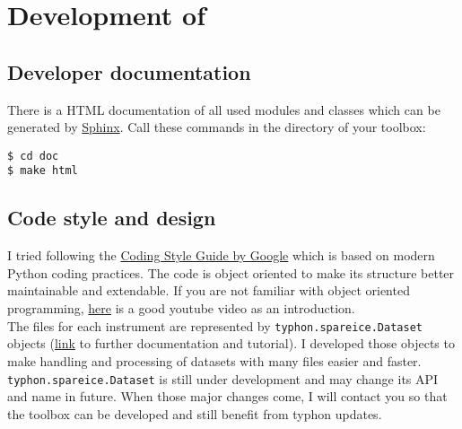 \documentclass[11pt,a4paper]{article}
\begin{document}
\section{Development of \cloud}
\label{sec:development}

\subsection{Developer documentation}
There is a HTML documentation of all used modules and classes which can be generated by \href{http://www.sphinx-doc.org/en/stable/install.html}{Sphinx}. Call these commands in the directory of your \cloud toolbox:

\texttt{\$ cd doc}\\
\texttt{\$ make html}\\

\subsection{Code style and design}
I tried following the \href{https://google.github.io/styleguide/pyguide.html}{Coding Style Guide by Google}  which is based on modern Python coding practices. The code is object oriented to make its structure better maintainable and extendable. If you are not familiar with object oriented programming, \href{https://www.youtube.com/watch?v=ZDa-Z5JzLYM}{here} is a good youtube video as an introduction.\\

The files for each instrument are represented by \texttt{typhon.spareice.Dataset} objects (\href{http://radiativetransfer.org/misc/typhon/doc-trunk/tutorials/dataset.html}{link} to further documentation and tutorial). I developed those objects to make handling and processing of datasets with many files easier and faster. \texttt{typhon.spareice.Dataset} is still under development and may change its API and name in future. When those major changes come, I will contact you so that the \cloud toolbox can be developed and still benefit from typhon updates.
\end{document}
